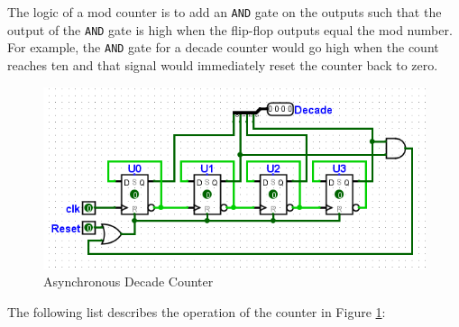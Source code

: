 The logic of a  mod counter is to add an \texttt{AND} gate on the outputs such that the output of the \texttt{AND} gate is high when the flip-flop outputs equal the mod number. For example, the \texttt{AND} gate for a decade counter would go high when the count reaches ten and that signal would immediately reset the counter back to zero.

\begin{figure}[H]
	\centering
	\includegraphics[width=\maxwidth{.95\linewidth}]{gfx/06-03}
	\caption{Asynchronous Decade Counter}
	\label{fig:06-03}
\end{figure}

The following list describes the operation of the counter in Figure \ref{fig:06-03}:

